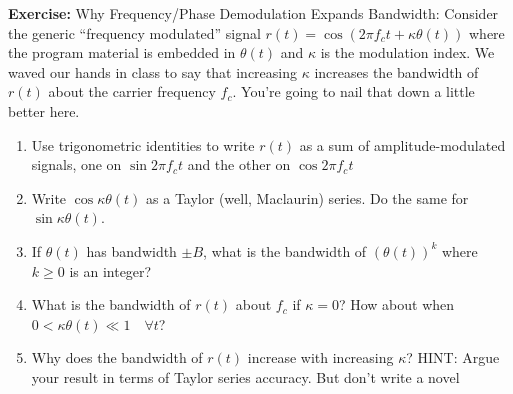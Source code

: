 \documentclass[12pt]{article}
\newenvironment*{exercise}[1][red]{
    \begin{tcolorbox}[
        parbox=false,
        colback=#1!5!white,
        colframe=#1!75!black,
        breakable
    ]}
    {\end{tcolorbox}}
\begin{document}
\begin{exercise}
    \textbf{Exercise:} Why Frequency/Phase Demodulation Expands Bandwidth: Consider the
generic ``frequency modulated” signal $r(t) = \cos (2\pi f_ct + \kappa \theta(t))$ where the program material is embedded in $\theta(t)$ and $\kappa$ is the modulation index. We waved our hands in class to say that increasing $\kappa$ increases the bandwidth of $r(t)$ about the carrier frequency $f_c$. You're going to nail that down a little better here.

\begin{enumerate}
    \item Use trigonometric identities to write $r(t)$ as a sum of amplitude-modulated
    signals, one on $\sin 2\pi f_ct$ and the other on $\cos 2\pi f_ct$

    \item Write $\cos \kappa \theta(t)$ as a Taylor (well, Maclaurin) series. Do the same for $\sin \kappa \theta(t)$.


    \item If $\theta(t)$ has bandwidth $\pm B$, what is the bandwidth of $(\theta(t))^k$ where $k \geq 0$ is an integer?
    

    \item What is the bandwidth of $r(t)$ about $f_c$ if $\kappa  = 0$? How about when $0 <
    \kappa \theta(t) \ll 1\quad \forall t$?
    \item Why does the bandwidth of $r(t)$ increase with increasing $\kappa$?
    HINT: Argue your result in terms of Taylor series accuracy. But don't write a novel

\end{enumerate}
\end{exercise}
\end{document}
